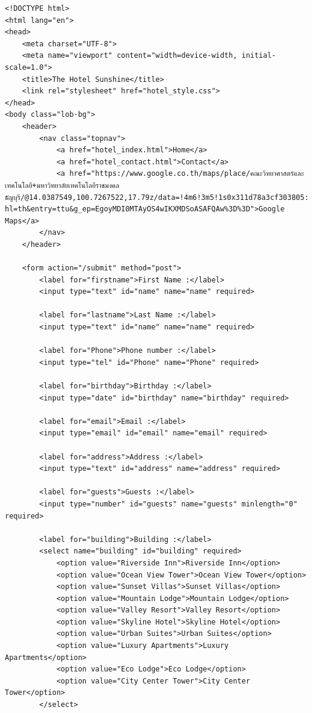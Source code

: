 \documentclass{report}
\begin{document}
\begin{verbatim}
<!DOCTYPE html>
<html lang="en">
<head>
    <meta charset="UTF-8">
    <meta name="viewport" content="width=device-width, initial-scale=1.0">
    <title>The Hotel Sunshine</title>
    <link rel="stylesheet" href="hotel_style.css">
</head>
<body class="lob-bg">
    <header>
        <nav class="topnav">
            <a href="hotel_index.html">Home</a>
            <a href="hotel_contact.html">Contact</a>
            <a href="https://www.google.co.th/maps/place/คณะวิทยาศาสตร์และเทคโนโลยี+มหาวิทยาลัยเทคโนโลยีราชมงคลธัญบุรี/@14.0387549,100.7267522,17.79z/data=!4m6!3m5!1s0x311d78a3cf303805:0x298cef6207b64026!8m2!3d14.0395596!4d100.7289406!16s%2Fg%2F12nvpzlcn?hl=th&entry=ttu&g_ep=EgoyMDI0MTAyOS4wIKXMDSoASAFQAw%3D%3D">Google Maps</a>
        </nav>
    </header>

    <form action="/submit" method="post">
        <label for="firstname">First Name :</label>
        <input type="text" id="name" name="name" required>

        <label for="lastname">Last Name :</label>
        <input type="text" id="name" name="name" required>

        <label for="Phone">Phone number :</label>
        <input type="tel" id="Phone" name="Phone" required>

        <label for="birthday">Birthday :</label>
        <input type="date" id="birthday" name="birthday" required>

        <label for="email">Email :</label>
        <input type="email" id="email" name="email" required>
        
        <label for="address">Address :</label>
        <input type="text" id="address" name="address" required>

        <label for="guests">Guests :</label>
        <input type="number" id="guests" name="guests" minlength="0" required>

        <label for="building">Building :</label>
        <select name="building" id="building" required>
            <option value="Riverside Inn">Riverside Inn</option>
            <option value="Ocean View Tower">Ocean View Tower</option>
            <option value="Sunset Villas">Sunset Villas</option>
            <option value="Mountain Lodge">Mountain Lodge</option>
            <option value="Valley Resort">Valley Resort</option>
            <option value="Skyline Hotel">Skyline Hotel</option>
            <option value="Urban Suites">Urban Suites</option>
            <option value="Luxury Apartments">Luxury Apartments</option>
            <option value="Eco Lodge">Eco Lodge</option>
            <option value="City Center Tower">City Center Tower</option>
        </select>


\end{verbatim}
\end{document}
